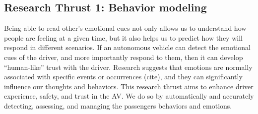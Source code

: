\subsection{Research Thrust 1: Behavior modeling}
\label{sec:behaviour}

 Being able to read other’s emotional cues not only allows us to understand how people are feeling at a given time, but it also helps us to predict how they will respond in different scenarios. 
 If an autonomous vehicle can detect the emotional cues of the driver, and more importantly respond to them, then it can develop ``human-like'' trust with the driver.
 Research suggests that emotions are normally associated with specific events or occurrences (cite), and they can significantly influence our thoughts and behaviors. 
 This research thrust aims to enhance driver experience, safety, and trust in the AV. 
 We do so by automatically and accurately detecting, assessing, and managing the passengers behaviors and emotions. 
 
